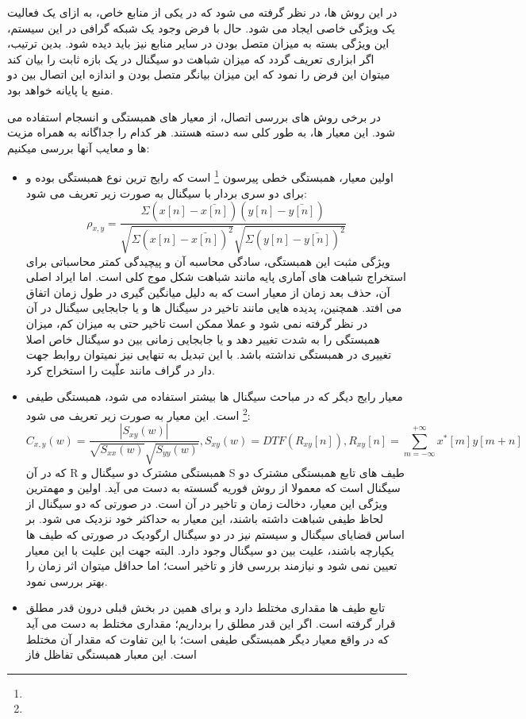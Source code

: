 \documentclass[11pt]{extarticle}
\begin{document}
در این روش ها، در نظر گرفته می شود که در یکی از منابع خاص، به ازای یک فعالیت یک ویژگی خاصی ایجاد می شود. حال با فرض وجود یک شبکه گرافی در این سیستم، این ویژگی بسته به میزان متصل بودن در سایر منابع نیز باید دیده شود. بدین ترتیب، اگر ابزاری تعریف گردد که میزان شباهت دو سیگنال در یک بازه ثابت را بیان کند میتوان این فرض را نمود که این میزان بیانگر متصل بودن و اندازه این اتصال بین دو منبع یا پایانه خواهد بود. 

در برخی روش های بررسی اتصال، از معیار های همبستگی و انسجام استفاده می شود. این معیار ها، به طور کلی سه دسته هستند. هر کدام را جداگانه به همراه مزیت ها و معایب آنها بررسی میکنیم:

\begin{itemize}
	\item[1]
	اولین معیار، همبستگی خطی پیرسون
	\footnote{}
	 است که رایج ترین نوع همبستگی بوده و برای دو سری بردار با سیگنال به صورت زیر تعریف می شود:
	$$ \rho_{x, y} = \frac{\Sigma(x[n] - \bar{x[n]})(y[n] - \bar{y[n]})}{\sqrt{\Sigma(x[n] - \bar{x[n]})^2}\sqrt{\Sigma(y[n] - \bar{y[n]})^2}} $$
	ویژگی مثبت این همبستگی، سادگی محاسبه آن و پیچیدگی کمتر محاسباتی برای استخراج شباهت های آماری پایه مانند شباهت شکل موج کلی است. اما ایراد اصلی آن، حذف بعد زمان از معیار است که به دلیل میانگین گیری در طول زمان اتفاق می افتد. همچنین، پدیده هایی مانند تاخیر در سیگنال ها و یا جابجایی سیگنال در آن در نظر گرفته نمی شود و عملا ممکن است تاخیر حتی به میزان کم، میزان همبستگی را به شدت تغییر دهد و یا جابجایی زمانی بین دو سیگنال خاص اصلا تغییری در همبستگی نداشته باشد. با این تبدیل به تنهایی نیز نمیتوان روابط جهت دار در گراف مانند علّیت را استخراج کرد.
	\item[2]
	معیار رایج دیگر که در مباحث سیگنال ها بیشتر استفاده می شود، همبستگی طیفی 
	\footnote{}
	است. این معیار به صورت زیر تعریف می شود:
	$$ C_{x, y} (w) = \frac{|S_{xy}(w)|}{\sqrt{S_{xx}(w)}\sqrt{S_{yy}(w)}}, S_{xy}(w) = DTF(R_{xy}[n]), R_{xy}[n] = \sum_{m = -\infty}^{+\infty} x^{*}[m]y[m+n] $$
	که در آن R همبستگی مشترک دو سیگنال و S طیف های تابع همبستگی مشترک دو سیگنال است که معمولا از روش فوریه گسسته به دست می آید. اولین و مهمترین ویژگی این معیار، دخالت زمان و تاخیر در آن است. در صورتی که دو سیگنال از لحاظ طیفی شباهت داشته باشند، این معیار به حداکثر خود نزدیک می شود. بر اساس قضایای سیگنال و سیستم نیز در دو سیگنال ارگودیک در صورتی که طیف ها یکپارچه باشند، علیت بین دو سیگنال وجود دارد. البته جهت این علیت با این معیار تعیین نمی شود و نیازمند بررسی فاز و تاخیر است؛ اما حداقل میتوان اثر زمان را بهتر بررسی نمود.
	\item[3]
	تابع طیف ها مقداری مختلط دارد و برای همین در بخش قبلی درون قدر مطلق قرار گرفته است. اگر این قدر مطلق را برداریم؛ مقداری مختلط به دست می آید که در واقع معیار دیگر همبستگی طیفی است؛ با این تفاوت که مقدار آن مختلط است. این معبار همبستگی تفاظل فاز 

\end{itemize}
\end{document}
